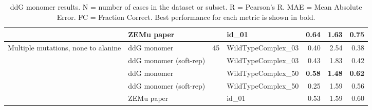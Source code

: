 \begin{table}
\begin{tabular}{llrlrrr}
 & ZEMu paper & & id\_01 & \textbf{0.64} & 1.63 & 0.75  \\
\hline
 \multirow{ 5}{*}{Multiple mutations, none to alanine} & ddG monomer & \multirow{ 5}{*}{45} & WildTypeComplex\_03 & 0.40 & 2.54 & 0.38  \\
 & ddG monomer (soft-rep) & & WildTypeComplex\_03 & 0.43 & 1.83 & 0.42  \\
 & ddG monomer & & WildTypeComplex\_50 & \textbf{0.58} & \textbf{1.48} & \textbf{0.62}  \\
 & ddG monomer (soft-rep) & & WildTypeComplex\_50 & 0.25 & 1.59 & 0.56  \\
 & ZEMu paper & & id\_01 & 0.53 & 1.59 & 0.60  \\
\bottomrule
\end{tabular}
  \caption[ddG monomer results]{
    ddG monomer results. N = number of cases in the dataset or subset. R = Pearson's R. MAE = Mean Absolute Error. FC = Fraction Correct. Best performance for each metric is shown in bold.
  } \label{tab:table-ddG-monomer}
\end{table}
